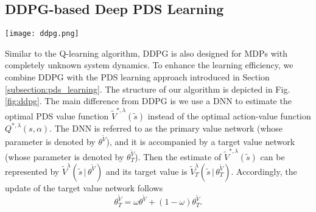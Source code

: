 \documentclass[lettersize, journal]{IEEEtran}
\begin{document}
\subsection{DDPG-based Deep PDS Learning}
\begin{figure*}[!t]
    \centering
    \texttt{[image: ddpg.png]}
    \caption{Algorithm structure of DDPG-based deep PDS learning.}
    \label{fig:ddpg}
\end{figure*}
Similar to the Q-learning algorithm, DDPG is also designed for MDPs with completely unknown system dynamics. To enhance the learning efficiency, we combine DDPG with the PDS learning approach introduced in Section \ref{subsection:pds_learning}. The structure of our algorithm is depicted in Fig. \ref{fig:ddpg}. The main difference from DDPG is we use a DNN to estimate the optimal PDS value function $\tilde{V}^{*,\lambda}(\tilde{s})$
instead of the optimal action-value function $Q^{*,\lambda}(s,\alpha)$. The DNN is referred to as the primary value network (whose parameter is denoted by $\theta^{\tilde{V}}$), and it is accompanied by a target value network (whose parameter is denoted by $\theta_T^{\tilde{V}}$).
Then the estimate of $\tilde{V}^{*,\lambda}(\tilde{s})$ can be represented by $\tilde{V}^{\lambda}(\tilde{s} \, | \, \theta^{\tilde{V}})$ and its target value is $\tilde{V}_T^{\lambda}(\tilde{s} \, | \, \theta_T^{\tilde{V}})$. Accordingly, the update of the target value network follows 
\begin{equation}
    \theta^{\tilde{V}}_T = \omega \theta^{\tilde{V}} + (1-\omega) \theta^{\tilde{V}}_T.
    \label{eq:target_value}
\end{equation}
\end{document}
